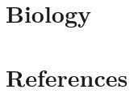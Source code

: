 

%

\newtoggle{thmsty}
\togglefalse{thmsty}

\newtoggle{longpres}
\togglefalse{longpres}









	\begin{frame}
		\titlepage
	\end{frame}
	
	\section{Biology}	
	
		
%	
%	
%		
%	
%	
%	
%    
%	
%	
%	
%	
%	
	\section{References}
	
	
